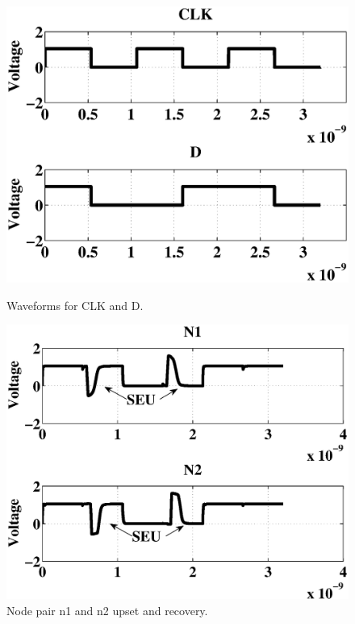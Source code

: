 \begin{figure}[!htbp]
	\centering
	\parbox{4cm}{
		\includegraphics[width=1.15\linewidth]{Figures/WavePlots/CLKD.eps}
		\caption{Waveforms for CLK and D.}
		\label{fig:CLK}}
	\qquad
	\begin{minipage}{4cm}
		\includegraphics[width=\linewidth]{Figures/WavePlots/n1n2.eps}
		\caption{Node pair n1 and n2 upset and recovery.}
		\label{fig:n1n2}
	\end{minipage}
\end{figure}

